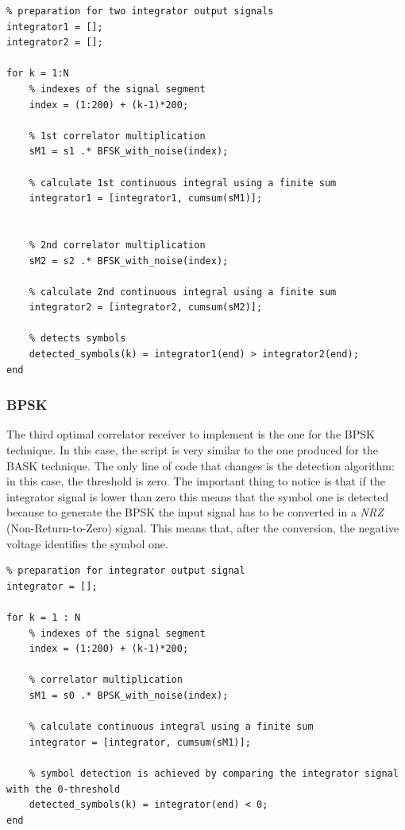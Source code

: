 \begin{lstlisting}
% preparation for two integrator output signals
integrator1 = []; 
integrator2 = [];

for k = 1:N
    % indexes of the signal segment
    index = (1:200) + (k-1)*200;

    % 1st correlator multiplication 
    sM1 = s1 .* BFSK_with_noise(index);  

    % calculate 1st continuous integral using a finite sum
    integrator1 = [integrator1, cumsum(sM1)];


    % 2nd correlator multiplication 
    sM2 = s2 .* BFSK_with_noise(index);

    % calculate 2nd continuous integral using a finite sum
    integrator2 = [integrator2, cumsum(sM2)];

    % detects symbols
    detected_symbols(k) = integrator1(end) > integrator2(end);
end
\end{lstlisting}

\subsubsection*{BPSK}
The third optimal correlator receiver to implement is the one for the BPSK technique. In this case, the script is very similar to the one produced for the BASK technique. The only line of code that changes is the detection algorithm: in this case, the threshold is zero. The important thing to notice is that if the integrator signal is lower than zero this means that the symbol one is detected because to generate the BPSK the input signal has to be converted in a \textsl{NRZ} (Non-Return-to-Zero) signal. This means that, after the conversion, the negative voltage identifies the symbol one.

\begin{lstlisting}
% preparation for integrator output signal 
integrator = [];    

for k = 1 : N
    % indexes of the signal segment
    index = (1:200) + (k-1)*200;

    % correlator multiplication 
    sM1 = s0 .* BPSK_with_noise(index);  

    % calculate continuous integral using a finite sum
    integrator = [integrator, cumsum(sM1)]; 

    % symbol detection is achieved by comparing the integrator signal with the 0-threshold
    detected_symbols(k) = integrator(end) < 0;
end
\end{lstlisting}


